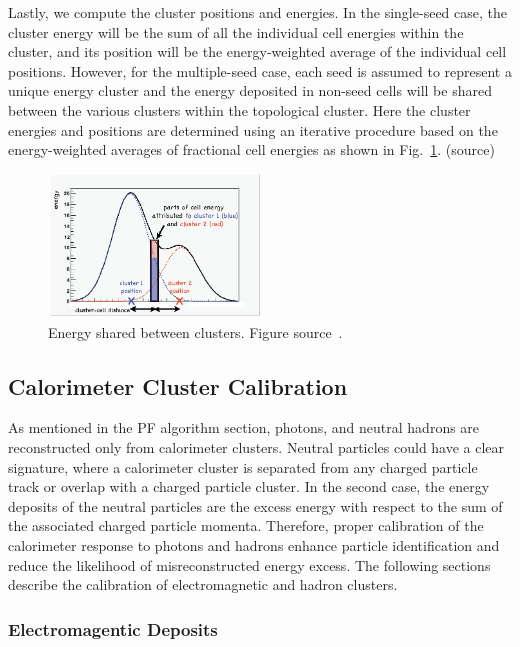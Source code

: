 Lastly, we compute the cluster positions and energies.
In the single-seed case, the cluster energy will be the sum of all the individual cell energies within the cluster, and its position will be the energy-weighted average of the individual cell positions.
However, for the multiple-seed case, each seed is assumed to represent a unique energy cluster and the energy deposited in non-seed cells will be shared between the various clusters within the topological cluster.
Here the cluster energies and positions are determined using an iterative procedure based on the energy-weighted averages of fractional cell energies as shown in Fig.~\ref{fig:clustering}. (source)

\begin{figure}[t!]
\centering
\includegraphics[width=0.50\textwidth]{figures/energy_sharing.png}
\caption[Energy shared between clusters]{Energy shared between clusters. Figure source~\cite{Clustering}.}
\label{fig:clustering}
\end{figure}

\subsection{Calorimeter Cluster Calibration}
\label{subsec:calibration}
As mentioned in the PF algorithm section, photons, and neutral hadrons are reconstructed only from calorimeter clusters.
Neutral particles could have a clear signature, where a calorimeter cluster is separated from any charged particle track or overlap with a charged particle cluster.
In the second case, the energy deposits of the neutral particles are the excess energy with respect to the sum of the associated charged particle momenta. Therefore, proper calibration of the calorimeter response to photons and hadrons enhance particle identification and reduce the likelihood of misreconstructed energy excess.
The following sections describe the calibration of electromagnetic and hadron clusters.

\subsubsection{Electromagentic Deposits}

